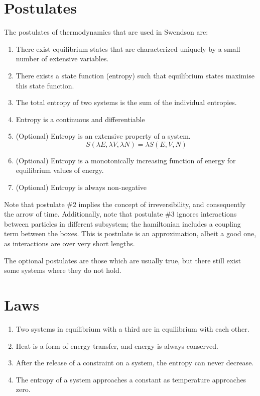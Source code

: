 \section{Postulates}
The postulates of thermodynamics that are used in Swendson are:
\begin{enumerate}
	\item There exist equilibrium states that are characterized uniquely by a small number of extensive variables.
	\item There exists a state function (entropy) such that equilibrium states maximise this state function.
	\item The total entropy of two systems is the sum of the individual entropies.
	\item Entropy is a continuous and differentiable 
	\item (Optional) Entropy is an extensive property of a system.
		\[S(\lambda E, \lambda V, \lambda N)= \lambda S(E,V,N)\]
	\item (Optional) Entropy is a monotonically increasing function of energy for equilibrium values of energy.
	\item (Optional) Entropy is always non-negative
\end{enumerate}
Note that postulate \#2 implies the concept of irreversibility, and consequently the arrow of time. 
Additionally, note that postulate \#3 ignores interactions between particles in different subsystem; the hamiltonian includes a coupling term between the boxes.  This is postulate is an approximation, albeit a good one, as interactions are over very short lengths.

The optional postulates are those which are usually true, but there still exist some systems where they do not hold.


\section{Laws}
\begin{enumerate}[start=0]
	\item Two systems in equilibrium with a third are in equilibrium with each other.
	\item Heat is a form of energy transfer, and energy is always conserved.
	\item After the release of a constraint on a system, the entropy can never decrease.
	\item The entropy of a system approaches a constant as temperature approaches zero.
\end{enumerate}

